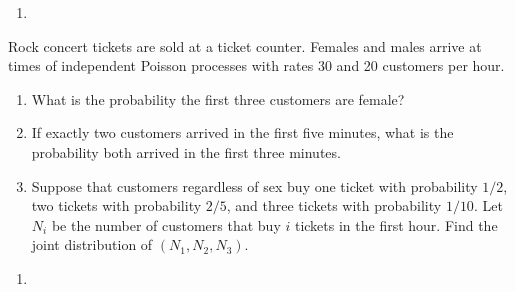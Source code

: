 \documentclass{Class}
\begin{document}
\solution
\begin{enumerate}
    \item 
\end{enumerate}
Rock concert tickets are sold at a ticket counter. Females and males arrive at times of independent Poisson processes with rates 30 and 20 customers per hour. 
\begin{enumerate}
    \item What is the probability the first three customers are female? 
    \item If exactly two customers arrived in the first five minutes, what is the probability both arrived in the first three minutes.
    \item Suppose that customers regardless of sex buy one ticket with probability $1 / 2$, two tickets with probability $2 / 5$, and three tickets with probability $1 / 10$. Let $N_i$ be the number of customers that buy $i$ tickets in the first hour. Find the joint distribution of $\left(N_1, N_2, N_3\right)$.
\end{enumerate}
\solution
\begin{enumerate}
    \item 
\end{enumerate}
\end{document}
